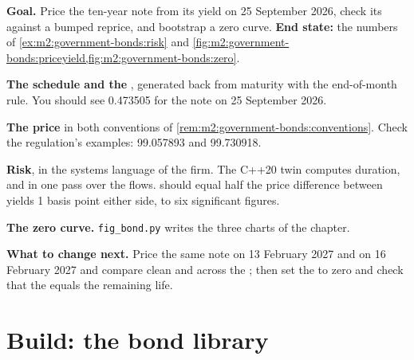 \begin{tutorial}
\textbf{Goal.} Price the ten-year note from its yield on 25 September 2026,
check its  against a bumped reprice, and bootstrap a zero curve.
\textbf{End state:} the numbers of \cref{ex:m2:government-bonds:risk} and
\cref{fig:m2:government-bonds:priceyield,fig:m2:government-bonds:zero}.
\begin{tutsteps}
\item \textbf{The schedule and the }, generated back from
maturity with the end-of-month rule.
\label{lst:m2:government-bonds:schedule}
You should see 0.473505 for the note on 25 September 2026.
\item \textbf{The price} in both conventions of \cref{rem:m2:government-bonds:conventions}.
\label{lst:m2:government-bonds:dirty}
Check the regulation's examples: 99.057893 and 99.730918.
\item \textbf{Risk}, in the systems language of the firm. The C++20 twin
computes duration,  and  in one pass over the flows.
\label{lst:m2:government-bonds:risk}
 should equal half the price difference between yields 1 basis point
either side, to six significant figures.
\item \textbf{The zero curve.}
\label{lst:m2:government-bonds:bootstrap}
\texttt{fig\_bond.py} writes the three charts of the chapter.
\end{tutsteps}
\textbf{What to change next.} Price the same note on 13 February 2027 and on
16 February 2027 and compare clean and  across the ; then
set the  to zero and check that the  equals the
remaining life.
\end{tutorial}

\section{Build: the bond library}\label{bld:m2:government-bonds:bond}

